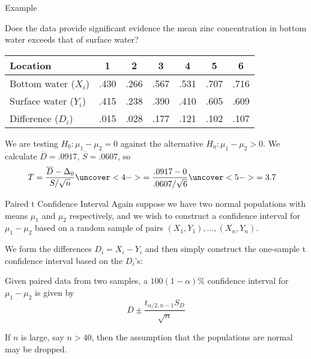 \documentclass[t,handout]{beamer}
\begin{document}
    \begin{frame}{Example}
    \begin{block}{}
    Does the data provide significant evidence the mean zinc concentration in bottom water exceeds that of surface water?
    \end{block}
    
    \begin{center}
    \begin{tabular}{l|cccccc}
    Location & 1 & 2 & 3 & 4 & 5 & 6 \\ \hline
    Bottom water ($X_i$) &
    .430 & .266 & .567 & .531 & .707 & .716 \\ \hline
    Surface water ($Y_i$) &
    .415 & .238 & .390 & .410 & .605 & .609 \\ \hline
    Difference ($D_i$) &.015 & .028 & .177 & .121 & .102 & .107
    \end{tabular}
    \end{center}
    
    \pause We are testing $H_0: \mu_1-\mu_2=0$ against the alternative $H_a: \mu_1-\mu_2>0$. \pause We calculate $\overline D = .0917$, $\overline S=.0607$, so
    \begin{align*}
    T&=\frac{\overline D-\Delta_0}{S/\sqrt{n}}
    \uncover<4->{= \frac{.0917-0}{.0607/\sqrt{6}} }
    \uncover<5->{=3.7}
    \end{align*}
    \end{frame}
    
    \begin{frame}{Paired t Confidence Interval}
    Again suppose we have two normal populations with means $\mu_1$ and $\mu_2$ respectively, and we wish to construct a confidence interval for $\mu_1-\mu_2$ based on a random sample of pairs $(X_1,Y_1), \dots, (X_n,Y_n)$. 
    
    \pause
    \vspace{.2cm}
    We form the differences $D_i=X_i-Y_i$ and then simply construct the one-sample t confidence interval based on the $D_i$'s:
    
    \pause
    \begin{block}{}
    Given paired data from two samples, a $100(1-\alpha)\%$ confidence interval for $\mu_1-\mu_2$ is given by
    $$\overline D \pm \frac{t_{\alpha/2,n-1}S_D}{\sqrt{n}}$$
    \end{block}
    
    \pause
    If $n$ is large, say $n>40$, then the assumption that the populations are normal may be dropped. \end{frame}
    
\end{document}
